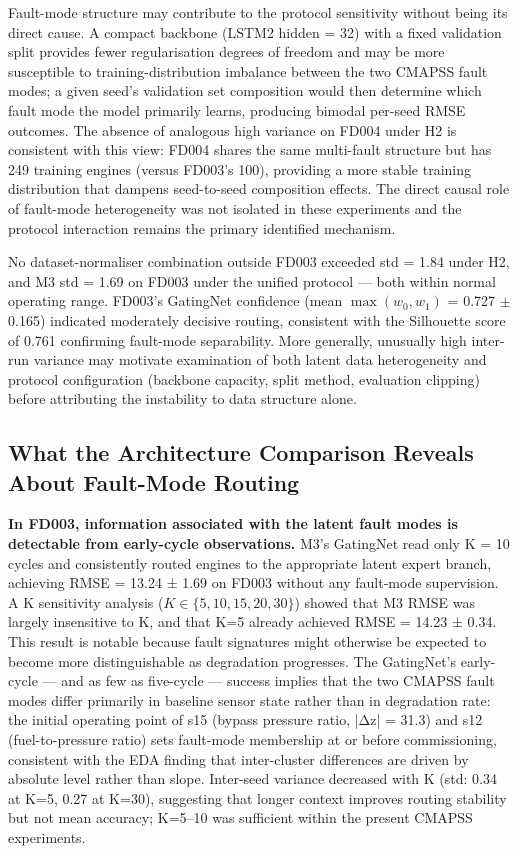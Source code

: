 \documentclass[review,12pt]{elsarticle}
\begin{document}
Fault-mode structure may contribute to the protocol sensitivity without being its direct cause. A compact backbone (LSTM2 hidden = 32) with a fixed validation split provides fewer regularisation degrees of freedom and may be more susceptible to training-distribution imbalance between the two CMAPSS fault modes; a given seed's validation set composition would then determine which fault mode the model primarily learns, producing bimodal per-seed RMSE outcomes. The absence of analogous high variance on FD004 under H2 is consistent with this view: FD004 shares the same multi-fault structure but has 249 training engines (versus FD003's 100), providing a more stable training distribution that dampens seed-to-seed composition effects. The direct causal role of fault-mode heterogeneity was not isolated in these experiments and the protocol interaction remains the primary identified mechanism.

No dataset-normaliser combination outside FD003 exceeded std = 1.84 under H2, and M3 std = 1.69 on FD003 under the unified protocol --- both within normal operating range. FD003's GatingNet confidence (mean $\max(w_0, w_1)$ = 0.727 $\pm$ 0.165) indicated moderately decisive routing, consistent with the Silhouette score of 0.761 confirming fault-mode separability. More generally, unusually high inter-run variance may motivate examination of both latent data heterogeneity and protocol configuration (backbone capacity, split method, evaluation clipping) before attributing the instability to data structure alone.

\subsection{What the Architecture Comparison Reveals About Fault-Mode Routing}

\textbf{In FD003, information associated with the latent fault modes is detectable from early-cycle observations.} M3's GatingNet read only K = 10 cycles and consistently routed engines to the appropriate latent expert branch, achieving RMSE = 13.24 ± 1.69 on FD003 without any fault-mode supervision. A K sensitivity analysis ($K \in \{5, 10, 15, 20, 30\}$) showed that M3 RMSE was largely insensitive to K, and that K=5 already achieved RMSE = 14.23 ± 0.34. This result is notable because fault signatures might otherwise be expected to become more distinguishable as degradation progresses. The GatingNet's early-cycle — and as few as five-cycle — success implies that the two CMAPSS fault modes differ primarily in baseline sensor state rather than in degradation rate: the initial operating point of s15 (bypass pressure ratio, |Δz| = 31.3) and s12 (fuel-to-pressure ratio) sets fault-mode membership at or before commissioning, consistent with the EDA finding that inter-cluster differences are driven by absolute level rather than slope. Inter-seed variance decreased with K (std: 0.34 at K=5, 0.27 at K=30), suggesting that longer context improves routing stability but not mean accuracy; K=5--10 was sufficient within the present CMAPSS experiments.
\end{document}
